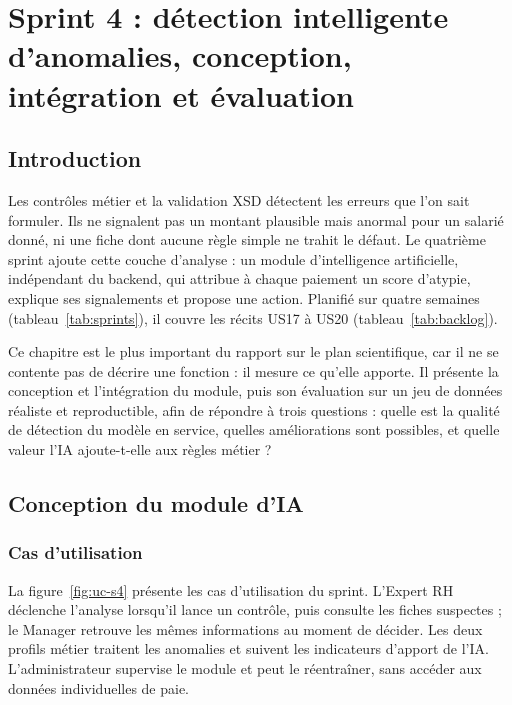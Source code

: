 \chapter{Sprint 4 : détection intelligente d'anomalies, conception, intégration et évaluation}
\label{ch:sprint4}
\startcontents[chapters]
\chapterplan

\section{Introduction}

Les contrôles métier et la validation XSD détectent les erreurs que l'on sait formuler. Ils ne signalent pas un montant plausible mais anormal pour un salarié donné, ni une fiche dont aucune règle simple ne trahit le défaut. Le quatrième sprint ajoute cette couche d'analyse : un module d'intelligence artificielle, indépendant du backend, qui attribue à chaque paiement un score d'atypie, explique ses signalements et propose une action. Planifié sur quatre semaines (tableau~\ref{tab:sprints}), il couvre les récits US17 à US20 (tableau~\ref{tab:backlog}).

Ce chapitre est le plus important du rapport sur le plan scientifique, car il ne se contente pas de décrire une fonction : il mesure ce qu'elle apporte. Il présente la conception et l'intégration du module, puis son évaluation sur un jeu de données réaliste et reproductible, afin de répondre à trois questions : quelle est la qualité de détection du modèle en service, quelles améliorations sont possibles, et quelle valeur l'IA ajoute-t-elle aux règles métier ?

\section{Conception du module d'IA}

\subsection{Cas d'utilisation}

La figure~\ref{fig:uc-s4} présente les cas d'utilisation du sprint. L'Expert RH déclenche l'analyse lorsqu'il lance un contrôle, puis consulte les fiches suspectes ; le Manager retrouve les mêmes informations au moment de décider. Les deux profils métier traitent les anomalies et suivent les indicateurs d'apport de l'IA. L'administrateur supervise le module et peut le réentraîner, sans accéder aux données individuelles de paie.

